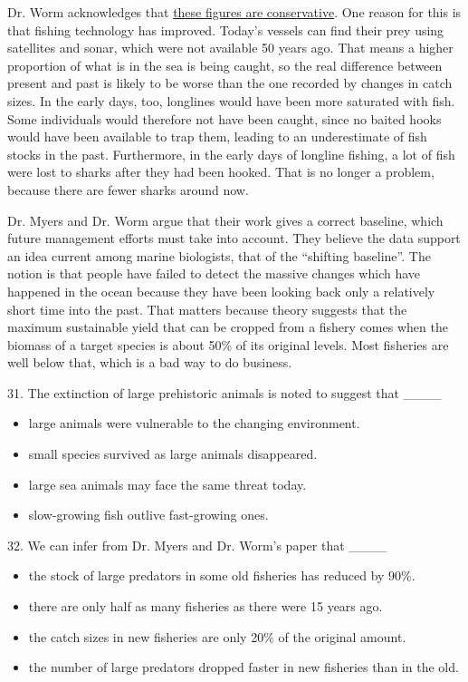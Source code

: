 \documentclass[UTF8,11pt]{ctexart}
\begin{document}
Dr. Worm acknowledges that \uline{these figures are conservative}. One reason for this is that fishing technology has improved. Today’s vessels can find their prey using satellites and sonar, which were not available 50 years ago. That means a higher proportion of what is in the sea is being caught, so the real difference between present and past is likely to be worse than the one recorded by changes in catch sizes. In the early days, too, longlines would have been more saturated with fish. Some individuals would therefore not have been caught, since no baited hooks would have been available to trap them, leading to an underestimate of fish stocks in the past. Furthermore, in the early days of longline fishing, a lot of fish were lost to sharks after they had been hooked. That is no longer a problem, because there are fewer sharks around now.


Dr. Myers and Dr. Worm argue that their work gives a correct baseline, which future management efforts must take into account. They believe the data support an idea current among marine biologists, that of the “shifting baseline”. The notion is that people have failed to detect the massive changes which have happened in the ocean because they have been looking back only a relatively short time into the past. That matters because theory suggests that the maximum sustainable yield that can be cropped from a fishery comes when the biomass of a target species is about 50\% of its original levels. Most fisheries are well below that, which is a bad way to do business.


31. The extinction of large prehistoric animals is noted to suggest that \_\_\_\_


\begin{itemize}[leftmargin=2em,itemsep=.2em,topsep=.4em]\item[A.] large animals were vulnerable to the changing environment.
\item[B.] small species survived as large animals disappeared.
\item[C.] large sea animals may face the same threat today.
\item[D.] slow-growing fish outlive fast-growing ones.
\end{itemize}

32. We can infer from Dr. Myers and Dr. Worm’s paper that \_\_\_\_


\begin{itemize}[leftmargin=2em,itemsep=.2em,topsep=.4em]\item[A.] the stock of large predators in some old fisheries has reduced by 90\%.
\item[B.] there are only half as many fisheries as there were 15 years ago.
\item[C.] the catch sizes in new fisheries are only 20\% of the original amount.
\item[D.] the number of large predators dropped faster in new fisheries than in the old.
\end{itemize}
\end{document}
